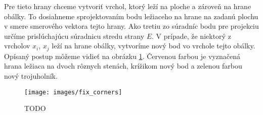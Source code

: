\begin{itemize}
{                Pre tieto hrany chceme vytvoriť vrchol, ktorý leží na ploche a zároveň na hrane obálky.
                To dosiahneme sprojektovaním bodu ležiaceho na hrane na zadanú plochu v smere 
                smerového vektora tejto hrany. Ako tretiu zo súradníc bodu pre projekciu určíme 
                prislúchajúcu súradnicu stredu strany $E$. V prípade, že niektorý z vrcholov 
                $x_i$, $x_j$ leží na hrane obálky, vytvoríme nový bod vo vrchole tejto obálky. 
                Opísaný postup môžeme vidieť na obrázku \ref{obr:fix_corners}. Červenou farbou 
                je vyznačená hrana ležiaca na dvoch rôznych stenách, krížikom nový bod a zelenou farbou
                nový trojuholník.
                
                
                \begin{figure}
                    \centerline{\texttt{[image: images/fix\_corners]}}
                    \caption[TODO]{TODO}
                    \label{obr:fix_corners}
                \end{figure}

    }
\end{itemize}